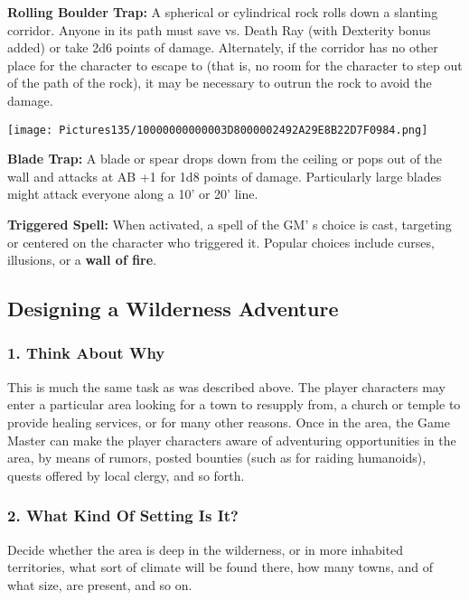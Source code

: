 \documentclass[a4paper,twoside,openany,10pt]{book}
\begin{document}
\begin{multicols}{2}
\textbf{Rolling Boulder Trap:} A spherical or cylindrical rock rolls down a slanting corridor. Anyone in its path must save vs. Death Ray (with Dexterity bonus added) or take 2d6 points of damage. Alternately, if the corridor has no other place for the character to escape to (that is, no room for the character to step out of the path of the rock), it may be necessary to outrun the rock to avoid the damage.

\begin{center}
	\texttt{[image: Pictures135/10000000000003D8000002492A29E8B22D7F0984.png]}
\end{center}

\textbf{Blade Trap:} A blade or spear drops down from the ceiling or pops out of the wall and attacks at AB +1 for 1d8 points of damage. Particularly large blades might attack everyone along a 10' or 20' line.

\textbf{Triggered Spell:} When activated, a spell of the GM' s choice is cast, targeting or centered on the character who triggered it. Popular choices include curses, illusions, or a \textbf{wall of fire}.

\subsection{Designing a Wilderness Adventure}\label{designing-a-wilderness-adventure}

\subsubsection{1. Think About Why}\label{think-about-why-1}

This is much the same task as was described above. The player characters may enter a particular area looking for a town to resupply from, a church or temple to provide healing services, or for many other reasons. Once in the area, the Game Master can make the player characters aware of adventuring opportunities in the area, by means of rumors, posted bounties (such as for raiding humanoids), quests offered by local clergy, and so forth.

\subsubsection{2. What Kind Of Setting Is It?}\label{what-kind-of-setting-is-it-1}

Decide whether the area is deep in the wilderness, or in more inhabited territories, what sort of climate will be found there, how many towns, and of what size, are present, and so on.


\end{multicols}
\end{document}
